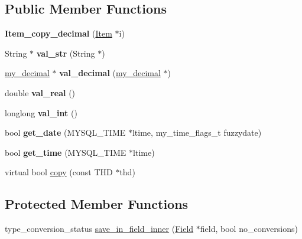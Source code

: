 \subsection*{Public Member Functions}
\begin{DoxyCompactItemize}
\item 
\mbox{\label{classItem__copy__decimal_a23c3c52d766682395b1afd4c1458fb04}} 
{\bfseries Item\+\_\+copy\+\_\+decimal} (\mbox{\hyperlink{classItem}{Item}} $\ast$i)
\item 
\mbox{\label{classItem__copy__decimal_ad7d26d63407d64671e6eef3c36b218bb}} 
String $\ast$ {\bfseries val\+\_\+str} (String $\ast$)
\item 
\mbox{\label{classItem__copy__decimal_a5ce91a37c8477f30813b9188f6d6590b}} 
\mbox{\hyperlink{classmy__decimal}{my\+\_\+decimal}} $\ast$ {\bfseries val\+\_\+decimal} (\mbox{\hyperlink{classmy__decimal}{my\+\_\+decimal}} $\ast$)
\item 
\mbox{\label{classItem__copy__decimal_a7d37cb74dbcad39db040d5fc0f29cf24}} 
double {\bfseries val\+\_\+real} ()
\item 
\mbox{\label{classItem__copy__decimal_a0cdddc999fae96efdaa0cdd4cbbce337}} 
longlong {\bfseries val\+\_\+int} ()
\item 
\mbox{\label{classItem__copy__decimal_a536dbdcb378e5543e1fa0a8cc8d41cb8}} 
bool {\bfseries get\+\_\+date} (M\+Y\+S\+Q\+L\+\_\+\+T\+I\+ME $\ast$ltime, my\+\_\+time\+\_\+flags\+\_\+t fuzzydate)
\item 
\mbox{\label{classItem__copy__decimal_a69a08c173e71a877ab7ac7bde4026e6e}} 
bool {\bfseries get\+\_\+time} (M\+Y\+S\+Q\+L\+\_\+\+T\+I\+ME $\ast$ltime)
\item 
virtual bool \mbox{\hyperlink{classItem__copy__decimal_a22459a6e13d4ab30f14818c9b0c65730}{copy}} (const T\+HD $\ast$thd)
\end{DoxyCompactItemize}
\subsection*{Protected Member Functions}
\begin{DoxyCompactItemize}
\item 
type\+\_\+conversion\+\_\+status \mbox{\hyperlink{classItem__copy__decimal_a8e57c99667202306a06a0c46d8f4597a}{save\+\_\+in\+\_\+field\+\_\+inner}} (\mbox{\hyperlink{classField}{Field}} $\ast$field, bool no\+\_\+conversions)
\end{DoxyCompactItemize}
